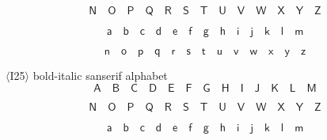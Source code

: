 \documentclass{book}
\begin{document}
\[\mathbf{\mathsf{N}}\quad \mathbf{\mathsf{O}}\quad \mathbf{\mathsf{P}}\quad
	\mathbf{\mathsf{Q}}\quad \mathbf{\mathsf{R}}\quad \mathbf{\mathsf{S}}\quad \mathbf{\mathsf{T}}\quad
	\mathbf{\mathsf{U}}\quad \mathbf{\mathsf{V}}\quad \mathbf{\mathsf{W}}\quad \mathbf{\mathsf{X}}\quad
	\mathbf{\mathsf{Y}}\quad \mathbf{\mathsf{Z}}\]

\[\mathbf{\mathsf{a}}\quad \mathbf{\mathsf{b}}\quad
	\mathbf{\mathsf{c}}\quad \mathbf{\mathsf{d}}\quad \mathbf{\mathsf{e}}\quad \mathbf{\mathsf{f}}\quad
	\mathbf{\mathsf{g}}\quad \mathbf{\mathsf{h}}\quad \mathbf{\mathsf{i}}\quad \mathbf{\mathsf{j}}\quad
	\mathbf{\mathsf{k}}\quad \mathbf{\mathsf{l}}\quad \mathbf{\mathsf{m}}\]

\[\mathbf{\mathsf{n}}\quad
	\mathbf{\mathsf{o}}\quad \mathbf{\mathsf{p}}\quad \mathbf{\mathsf{q}}\quad \mathbf{\mathsf{r}}\quad
	\mathbf{\mathsf{s}}\quad \mathbf{\mathsf{t}}\quad \mathbf{\mathsf{u}}\quad \mathbf{\mathsf{v}}\quad
	\mathbf{\mathsf{w}}\quad \mathbf{\mathsf{x}}\quad \mathbf{\mathsf{y}}\quad \mathbf{\mathsf{z}}\]

$\langle$I25$\rangle$ bold-italic sanserif alphabet
\[\mathit{\mathbf{\mathsf{A}}}\quad \mathit{\mathbf{\mathsf{B}}}\quad \mathit{\mathbf{\mathsf{C}}}\quad
	\mathit{\mathbf{\mathsf{D}}}\quad \mathit{\mathbf{\mathsf{E}}}\quad \mathit{\mathbf{\mathsf{F}}}\quad
	\mathit{\mathbf{\mathsf{G}}}\quad \mathit{\mathbf{\mathsf{H}}}\quad \mathit{\mathbf{\mathsf{I}}}\quad
	\mathit{\mathbf{\mathsf{J}}}\quad \mathit{\mathbf{\mathsf{K}}}\quad \mathit{\mathbf{\mathsf{L}}}\quad
	\mathit{\mathbf{\mathsf{M}}}\]

\[\mathit{\mathbf{\mathsf{N}}}\quad \mathit{\mathbf{\mathsf{O}}}\quad
	\mathit{\mathbf{\mathsf{P}}}\quad \mathit{\mathbf{\mathsf{Q}}}\quad \mathit{\mathbf{\mathsf{R}}}\quad
	\mathit{\mathbf{\mathsf{S}}}\quad \mathit{\mathbf{\mathsf{T}}}\quad \mathit{\mathbf{\mathsf{U}}}\quad
	\mathit{\mathbf{\mathsf{V}}}\quad \mathit{\mathbf{\mathsf{W}}}\quad \mathit{\mathbf{\mathsf{X}}}\quad
	\mathit{\mathbf{\mathsf{Y}}}\quad \mathit{\mathbf{\mathsf{Z}}}\]

\[\mathit{\mathbf{\mathsf{a}}}\quad
	\mathit{\mathbf{\mathsf{b}}}\quad \mathit{\mathbf{\mathsf{c}}}\quad \mathit{\mathbf{\mathsf{d}}}\quad
	\mathit{\mathbf{\mathsf{e}}}\quad \mathit{\mathbf{\mathsf{f}}}\quad \mathit{\mathbf{\mathsf{g}}}\quad
	\mathit{\mathbf{\mathsf{h}}}\quad \mathit{\mathbf{\mathsf{i}}}\quad \mathit{\mathbf{\mathsf{j}}}\quad
	\mathit{\mathbf{\mathsf{k}}}\quad \mathit{\mathbf{\mathsf{l}}}\quad \mathit{\mathbf{\mathsf{m}}}\]
\end{document}
